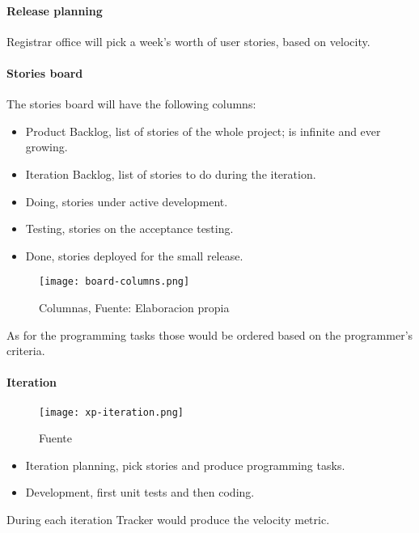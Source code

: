 \paragraph{Release planning} Registrar office will pick a week's worth of user stories, based on velocity.

\paragraph{Stories board} The stories board will have the following columns:
\begin{itemize}
    \item Product Backlog, list of stories of the whole project; is infinite and ever growing.
    \item Iteration Backlog, list of stories to do during the iteration.
    \item Doing, stories under active development.
    \item Testing, stories on the acceptance testing.
    \item Done, stories deployed for the small release.
\end{itemize}

\begin{figure}
    \texttt{[image: board-columns.png]}
    \caption{Columnas, Fuente: Elaboracion propia}\label{fig:board-columns}
\end{figure}

As for the programming tasks those would be ordered based on the programmer's criteria.

\paragraph{Iteration}

\begin{figure}
    \texttt{[image: xp-iteration.png]}
    \caption{Fuente \textcite{XpWeb}}\label{fig:xp-iteration}
\end{figure}

\begin{itemize}
    \item Iteration planning, pick stories and produce programming tasks.
    \item Development, first unit tests and then coding.
\end{itemize}

During each iteration Tracker would produce the velocity metric.

